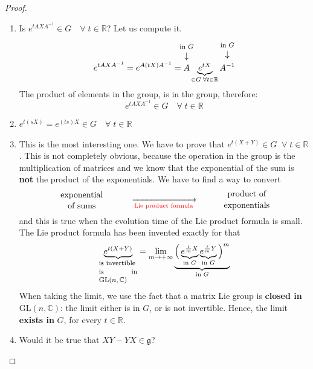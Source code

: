 \documentclass[../main.tex]{subfiles}
\begin{document}
\begin{proof}
\renewcommand{\labelenumi}{\arabic{enumi})}
\begin{enumerate}
    \item Is $e^{tAXA^{-1}}\in G\quad \forall\;t\in\mathbb{R}$? Let us compute it.
    \[
    e^{tAXA^{-1}}=e^{A(tX)A^{-1}}=\overset{\mathclap{\tikz \node {$\downarrow$} node [above=1.25ex] {\footnotesize in $G$};}}{A}\underbrace{e^{tX}}_{\in G\;\forall t\in\mathbb{R}}\overset{\mathclap{\tikz \node {$\downarrow$} node [above=1.25ex] {\footnotesize in $G$};}}{A^{-1}}
    \]
    The product of elements in the group, is in the group, therefore:
    \[
    e^{tAXA^{-1}}\in G\quad \forall\;t\in\mathbb{R}
    \]
    \item $e^{t(sX)}=e^{(ts)X}\in G\quad \forall\;t\in\mathbb{R}$
    \item This is the most interesting one. We have to prove that $e^{t(X+Y)}\in G\;\;\forall\;t\in\mathbb{R}$. This is not completely obvious, because the operation in the group is the multiplication of matrices and we know that the exponential of the sum is \textbf{not} the product of the exponentials. We have to find a way to convert
    \[
    \text{\parbox{4 cm}{\centering exponential\\[1pt] of sums}}\xrightarrow[\textrm{{\color{red}Lie product formula}}]{}\text{\parbox{4 cm}{\centering product of\\[1.5pt] exponentials }}
    \]
    and this is true when the evolution time of the Lie product formula is small. The Lie product formula has been invented exactly for that
    \[
    \underbrace{e^{t(X+Y)}}_{\parbox{1.6cm}{\footnotesize is invertible\\[1pt]is in $\textrm{GL}(n,\mathbb{C})$}}=\lim_{m\to+\infty}\underbrace{\Big(\underbrace{e^{\frac{t}{m}X}}_{\textrm{in }G}\underbrace{e^{\frac{t}{m}Y}}_{\textrm{in }G}\Big)^m}_{\textrm{in }G}
    \]
    When taking the limit, we use the fact that a matrix Lie group is \textbf{closed in} $\textrm{GL}(n,\mathbb{C})$: the limit either is in $G$, or is not invertible. Hence, the limit \textbf{exists in} $G$, for every $t\in\mathbb{R}$.
    \item Would it be true that $XY-YX\in\mathfrak{g}$?
    

\end{enumerate}
\end{proof}
\end{document}
